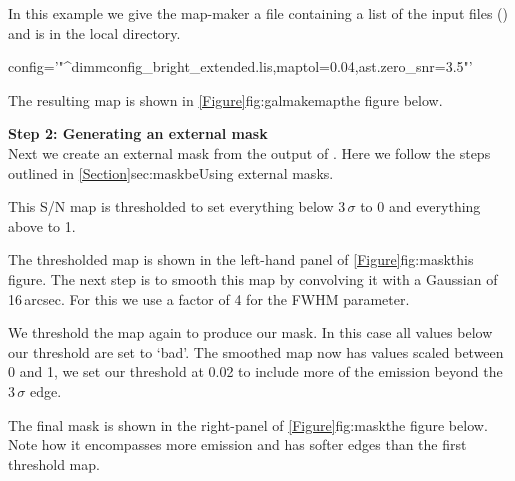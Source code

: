 In this example we give the map-maker a file containing a list of the
input files () and
 is in the local directory.

\begin{terminalv}
          config='"^dimmconfig_bright_extended.lis,maptol=0.04,ast.zero_snr=3.5"'
\end{terminalv}
The resulting map is shown in \cref{Figure}{fig:galmakemap}{the figure below}.


\textbf{Step 2: Generating an external mask}
\vspace{0.2cm}\\
Next we create an external mask from the output of \makemap. Here we
follow the steps outlined in \cref{Section}{sec:maskbe}{Using external
masks}.

\begin{terminalv}
\end{terminalv}

This S/N map is thresholded to set everything below 3\,$\sigma$ to 0 and
everything above to 1.

\begin{terminalv}
\end{terminalv}
The thresholded map is shown in the left-hand panel of
\cref{Figure}{fig:mask}{this figure}. The next step is to smooth this map
by convolving it with a Gaussian of 16\,arcsec. For this we use a factor
of 4 for the FWHM parameter.

\begin{terminalv}
\end{terminalv}

We threshold the map again to produce our mask. In this case all
values below our threshold are set to `bad'. The smoothed map now
has values scaled between 0 and 1, we set our threshold at 0.02 to
include more of the emission beyond the 3\,$\sigma$ edge.
\begin{terminalv}
\end{terminalv}
The final mask is shown in the right-panel of \cref{Figure}{fig:mask}{the figure below}.
Note how it encompasses more emission and has softer edges than the
first threshold map. \\

